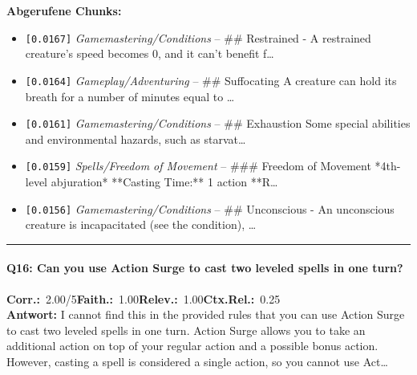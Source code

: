 \noindent\textbf{Abgerufene Chunks:}
\begin{itemize}[noitemsep, topsep=2pt]
  \item[\textbf{\#1}] \texttt{[0.0167]} \textit{Gamemastering/Conditions} -- \#\# Restrained  - A restrained creature's speed becomes 0, and it can't benefit f\ldots
  \item[\textbf{\#2}] \texttt{[0.0164]} \textit{Gameplay/Adventuring} -- \#\# Suffocating  A creature can hold its breath for a number of minutes equal to \ldots
  \item[\textbf{\#3}] \texttt{[0.0161]} \textit{Gamemastering/Conditions} -- \#\# Exhaustion  Some special abilities and environmental hazards, such as starvat\ldots
  \item[\textbf{\#4}] \texttt{[0.0159]} \textit{Spells/Freedom of Movement} -- \#\#\# Freedom of Movement  *4th-level abjuration*  **Casting Time:** 1 action  **R\ldots
  \item[\textbf{\#5}] \texttt{[0.0156]} \textit{Gamemastering/Conditions} -- \#\# Unconscious  - An unconscious creature is incapacitated (see the condition), \ldots
\end{itemize}
\vspace{4pt}
\hrule
\vspace{6pt}

\paragraph{Q16: Can you use Action Surge to cast two leveled spells in one turn?}
\noindent \textbf{Corr.:}~2.00/5\quad \textbf{Faith.:}~1.00\quad \textbf{Relev.:}~1.00\quad \textbf{Ctx.Rel.:}~0.25\\

\noindent\textbf{Antwort:} I cannot find this in the provided rules that you can use Action Surge to cast two leveled spells in one turn. Action Surge allows you to take an additional action on top of your regular action and a possible bonus action. However, casting a spell is considered a single action, so you cannot use Act\ldots


